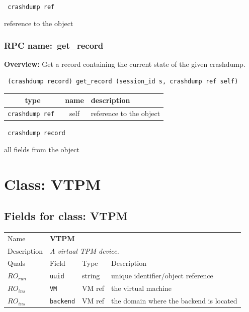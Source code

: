 \vspace{0.3cm}

{\tt 
crashdump ref
}


reference to the object
\vspace{0.3cm}
\vspace{0.3cm}
\vspace{0.3cm}
\subsubsection{RPC name:~get\_record}

{\bf Overview:} 
Get a record containing the current state of the given crashdump.

\begin{verbatim} (crashdump record) get_record (session_id s, crashdump ref self)\end{verbatim}



 
\vspace{0.3cm}
\begin{tabular}{|c|c|p{7cm}|}
 \hline
{\bf type} & {\bf name} & {\bf description} \\ \hline
{\tt crashdump ref } & self & reference to the object \\ \hline 

\end{tabular}

\vspace{0.3cm}

{\tt 
crashdump record
}


all fields from the object
\vspace{0.3cm}
\vspace{0.3cm}
\vspace{0.3cm}

\vspace{1cm}
\newpage
\section{Class: VTPM}
\subsection{Fields for class: VTPM}
\begin{longtable}{|lllp{}|}
\hline
\multicolumn{1}{|l}{Name} & \multicolumn{3}{l|}{\bf VTPM} \\
\multicolumn{1}{|l}{Description} & \multicolumn{3}{l|}{\parbox{11cm}{\em A
virtual TPM device.}} \\
\hline
Quals & Field & Type & Description \\
\hline
$\mathit{RO}_\mathit{run}$ &  {\tt uuid} & string & unique identifier/object reference \\
$\mathit{RO}_\mathit{ins}$ &  {\tt VM} & VM ref & the virtual machine \\
$\mathit{RO}_\mathit{ins}$ &  {\tt backend} & VM ref & the domain where the backend is located \\
\hline
\end{longtable}
